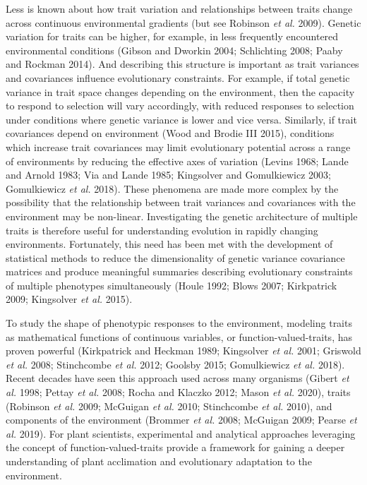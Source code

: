 \documentclass[jou,floatsintext]{apa6}
\begin{document}
Less is known about how trait variation and relationships between traits change across continuous environmental gradients (but see Robinson \emph{et al.} 2009). Genetic variation for traits can be higher, for example, in less frequently encountered environmental conditions (Gibson and Dworkin 2004; Schlichting 2008; Paaby and Rockman 2014). And describing this structure is important as trait variances and covariances influence evolutionary constraints. For example, if total genetic variance in trait space changes depending on the environment, then the capacity to respond to selection will vary accordingly, with reduced responses to selection under conditions where genetic variance is lower and vice versa. Similarly, if trait covariances depend on environment (Wood and Brodie III 2015), conditions which increase trait covariances may limit evolutionary potential across a range of environments by reducing the effective axes of variation (Levins 1968; Lande and Arnold 1983; Via and Lande 1985; Kingsolver and Gomulkiewicz 2003; Gomulkiewicz \emph{et al.} 2018). These phenomena are made more complex by the possibility that the relationship between trait variances and covariances with the environment may be non-linear. Investigating the genetic architecture of multiple traits is therefore useful for understanding evolution in rapidly changing environments. Fortunately, this need has been met with the development of statistical methods to reduce the dimensionality of genetic variance covariance matrices and produce meaningful summaries describing evolutionary constraints of multiple phenotypes simultaneously (Houle 1992; Blows 2007; Kirkpatrick 2009; Kingsolver \emph{et al.} 2015).

To study the shape of phenotypic responses to the environment, modeling traits as mathematical functions of continuous variables, or function-valued-traits, has proven powerful (Kirkpatrick and Heckman 1989; Kingsolver \emph{et al.} 2001; Griswold \emph{et al.} 2008; Stinchcombe \emph{et al.} 2012; Goolsby 2015; Gomulkiewicz \emph{et al.} 2018). Recent decades have seen this approach used across many organisms (Gibert \emph{et al.} 1998; Pettay \emph{et al.} 2008; Rocha and Klaczko 2012; Mason \emph{et al.} 2020), traits (Robinson \emph{et al.} 2009; McGuigan \emph{et al.} 2010; Stinchcombe \emph{et al.} 2010), and components of the environment (Brommer \emph{et al.} 2008; McGuigan 2009; Pearse \emph{et al.} 2019). For plant scientists, experimental and analytical approaches leveraging the concept of function-valued-traits provide a framework for gaining a deeper understanding of plant acclimation and evolutionary adaptation to the environment.
\end{document}
